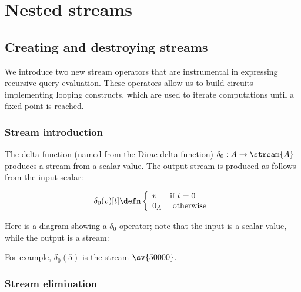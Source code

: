 \section{Nested streams}\label{sec:nested}

\subsection{Creating and destroying streams}\label{sec:stream-intro-elim}

We introduce two new stream operators that are instrumental in
expressing recursive query evaluation.  These operators allow us
to build circuits implementing looping constructs, which
are used to iterate computations until a fixed-point is reached.

\subsubsection{Stream introduction}\label{sec:stream-introduction}

\begin{definition}
The delta function (named from the Dirac delta function) $\delta_0 : A \rightarrow \stream{A}$
produces a stream from a scalar value.
The output stream is produced as follows from the input scalar:

$$\delta_0(v)[t] \defn \left\{
\begin{array}{ll}
  v & \mbox{if } t = 0 \\
  0_A & \mbox{ otherwise}
\end{array}
\right.
$$
\end{definition}

Here is a diagram showing a $\delta_0$ operator; note that the input is a scalar value,
while the output is a stream:

\begin{center}
\end{center}

For example, $\delta_0(5)$ is the stream $\sv{5 0 0 0 0}$.

\subsubsection{Stream elimination}\label{sec:stream-elimination}

